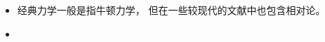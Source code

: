 
\begin{issues}
\issueDraft
\end{issues}

\begin{itemize}
\item 经典力学一般是指牛顿力学， 但在一些较现代的文献中也包含相对论。
\item 
\end{itemize}
